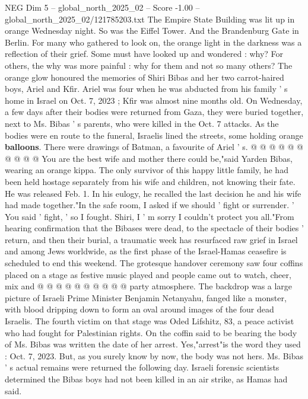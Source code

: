\begin{textsample}{NEG Dim 5 – global\_north\_2025\_02 – Score -1.00 – global\_north\_2025\_02/121785203.txt}  \label{ex:f5_neg_124}
The Empire State Building was lit up in orange Wednesday night.
So was the Eiffel Tower.
And the Brandenburg Gate in Berlin.
For many who gathered to look on, the orange light in the darkness was a reflection of their grief.
Some must have looked up and wondered : why?
For others, the why was more painful : why for them and not so many others?
The orange glow honoured the memories of Shiri Bibas and her two carrot-haired boys, Ariel and Kfir.
Ariel was four when he was abducted from his family ' s home in Israel on Oct. 7, 2023 ; Kfir was almost nine months old.
On Wednesday, a few days after their bodies were returned from Gaza, they were buried together, next to Ms.
Bibas ' s parents, who were killed in the Oct. 7 attacks.
As the bodies were en route to the funeral, Israelis lined the streets, some holding orange \textbf{balloons}.
There were drawings of Batman, a favourite of Ariel ' s. @ @ @ @ @ @ @ @ @ @ You are the best wife and mother there could be,"said Yarden Bibas, wearing an orange kippa.
The only survivor of this happy little family, he had been held hostage separately from his wife and children, not knowing their fate.
He was released Feb. 1.
In his eulogy, he recalled the last decision he and his wife had made together."In the safe room, I asked if we should ' fight or surrender. ' You said ' fight, ' so I fought.
Shiri, I ' m sorry I couldn't protect you all."From hearing confirmation that the Bibases were dead, to the spectacle of their bodies ' return, and then their burial, a traumatic week has resurfaced raw grief in Israel and among Jews worldwide, as the first phase of the Israel-Hamas ceasefire is scheduled to end this weekend.
The grotesque handover ceremony saw four coffins placed on a stage as festive music played and people came out to watch, cheer, mix and @ @ @ @ @ @ @ @ @ @ party atmosphere.
The backdrop was a large picture of Israeli Prime Minister Benjamin Netanyahu, fanged like a monster, with blood dripping down to form an oval around images of the four dead Israelis.
The fourth victim on that stage was Oded Lifshitz, 83, a peace activist who had fought for Palestinian rights.
On the coffin said to be bearing the body of Ms.
Bibas was written the date of her arrest.
Yes,"arrest"is the word they used : Oct. 7, 2023.
But, as you surely know by now, the body was not hers.
Ms.
Bibas ' s actual remains were returned the following day.
Israeli forensic scientists determined the Bibas boys had not been killed in an air strike, as Hamas had said.

\end{textsample}
